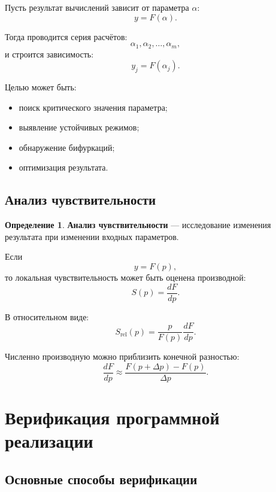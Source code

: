 \documentclass[12pt,a4paper]{article}
\theoremstyle{definition}
\newtheorem{definition}{Определение}
\theoremstyle{plain}
\begin{document}
Пусть результат вычислений зависит от параметра $\alpha$:
\[
y = F(\alpha).
\]

Тогда проводится серия расчётов:
\[
\alpha_1,\alpha_2,\dots,\alpha_m,
\]
и строится зависимость:
\[
y_j=F(\alpha_j).
\]

Целью может быть:
\begin{itemize}
    \item поиск критического значения параметра;
    \item выявление устойчивых режимов;
    \item обнаружение бифуркаций;
    \item оптимизация результата.
\end{itemize}

\subsection{Анализ чувствительности}

\begin{definition}
\textbf{Анализ чувствительности} --- исследование изменения результата при изменении входных параметров.
\end{definition}

Если
\[
y=F(p),
\]
то локальная чувствительность может быть оценена производной:
\[
S(p)=\frac{dF}{dp}.
\]

В относительном виде:
\[
S_{\text{rel}}(p)
=
\frac{p}{F(p)}\frac{dF}{dp}.
\]

Численно производную можно приблизить конечной разностью:
\[
\frac{dF}{dp}
\approx
\frac{F(p+\Delta p)-F(p)}{\Delta p}.
\]

\section{Верификация программной реализации}

\subsection{Основные способы верификации}
\end{document}
